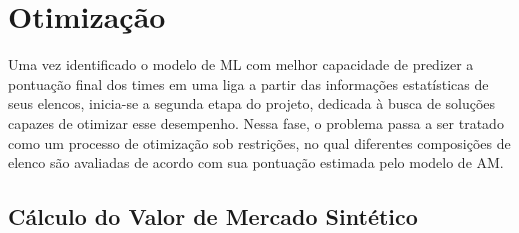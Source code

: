 \section{Otimização}

Uma vez identificado o modelo de ML com melhor capacidade de predizer a pontuação final dos times em uma liga a partir das informações estatísticas de seus elencos, 
inicia-se a segunda etapa do projeto, dedicada à busca de soluções capazes de otimizar esse desempenho. 
Nessa fase, o problema passa a ser tratado como um processo de otimização sob restrições, no qual diferentes composições de elenco são avaliadas de acordo com 
sua pontuação estimada pelo modelo de AM.

\subsection{Cálculo do Valor de Mercado Sintético}

